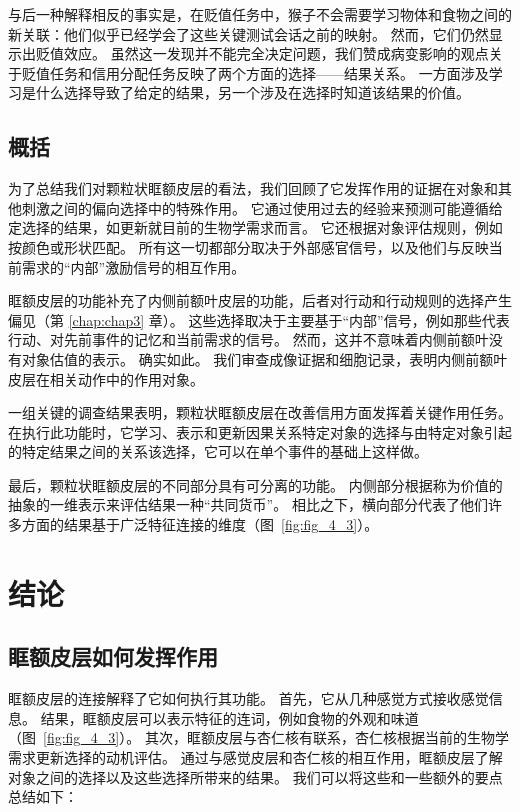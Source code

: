 与后一种解释相反的事实是，在贬值任务中，猴子不会需要学习物体和食物之间的新关联：他们似乎已经学会了这些关键测试会话之前的映射。
然而，它们仍然显示出贬值效应。
虽然这一发现并不能完全决定问题，我们赞成病变影响的观点关于贬值任务和信用分配任务反映了两个方面的选择——结果关系。
一方面涉及学习是什么选择导致了给定的结果，另一个涉及在选择时知道该结果的价值。\par



\subsection{概括}

为了总结我们对颗粒状眶额皮层的看法，我们回顾了它发挥作用的证据在对象和其他刺激之间的偏向选择中的特殊作用。
它通过使用过去的经验来预测可能遵循给定选择的结果，如更新就目前的生物学需求而言。
它还根据对象评估规则，例如按颜色或形状匹配。
所有这一切都部分取决于外部感官信号，以及他们与反映当前需求的“内部”激励信号的相互作用。\par


眶额皮层的功能补充了内侧前额叶皮层的功能，后者对行动和行动规则的选择产生偏见（第 \ref{chap:chap3} 章）。
这些选择取决于主要基于“内部”信号，例如那些代表行动、对先前事件的记忆和当前需求的信号。
然而，这并不意味着内侧前额叶没有对象估值的表示。
确实如此。 我们审查成像证据和细胞记录，表明内侧前额叶皮层在相关动作中的作用对象。\par


一组关键的调查结果表明，颗粒状眶额皮层在改善信用方面发挥着关键作用任务。
在执行此功能时，它学习、表示和更新因果关系特定对象的选择与由特定对象引起的特定结果之间的关系该选择，它可以在单个事件的基础上这样做。\par


最后，颗粒状眶额皮层的不同部分具有可分离的功能。
内侧部分根据称为价值的抽象的一维表示来评估结果一种“共同货币”。
相比之下，横向部分代表了他们许多方面的结果基于广泛特征连接的维度（图~\ref{fig:fig_4_3}）。\par



\section{结论}

\subsection{眶额皮层如何发挥作用}

眶额皮层的连接解释了它如何执行其功能。
首先，它从几种感觉方式接收感觉信息。
结果，眶额皮层可以表示特征的连词，例如食物的外观和味道（图~\ref{fig:fig_4_3}）。
其次，眶额皮层与杏仁核有联系，杏仁核根据当前的生物学需求更新选择的动机评估。
通过与感觉皮层和杏仁核的相互作用，眶额皮层了解对象之间的选择以及这些选择所带来的结果。
我们可以将这些和一些额外的要点总结如下：\par



